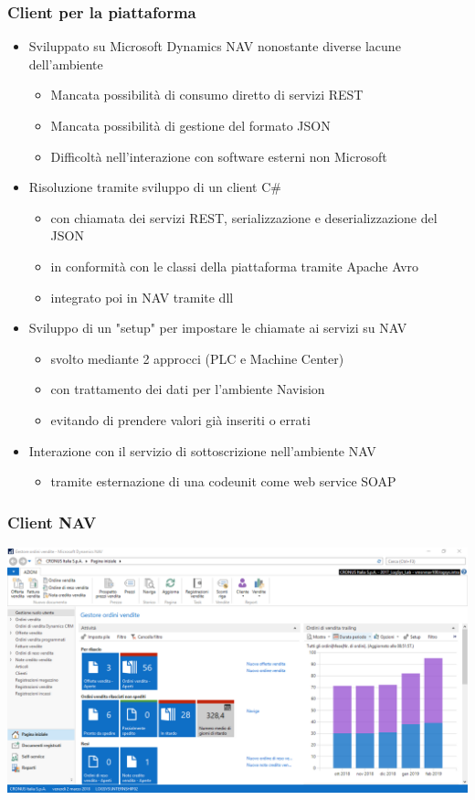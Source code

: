 \documentclass{beamer}
\begin{document}
\begin{frame}
\frametitle{Client per la piattaforma}
\begin{itemize}
\item Sviluppato su Microsoft Dynamics NAV nonostante diverse lacune dell'ambiente
\begin{itemize}
\item Mancata possibilità di consumo diretto di servizi REST
\item Mancata possibilità di gestione del formato JSON
\item Difficoltà nell'interazione con software esterni non Microsoft
\end{itemize}
\item Risoluzione tramite sviluppo di un client C\#
\begin{itemize}
\item con chiamata dei servizi REST, serializzazione e deserializzazione del JSON
\item in conformità con le classi della piattaforma tramite Apache Avro
\item integrato poi in NAV tramite dll 
\end{itemize}
\item Sviluppo di un "setup" per impostare le chiamate ai servizi su NAV
\begin{itemize}
\item svolto mediante 2 approcci (PLC e Machine Center)
\item con trattamento dei dati per l'ambiente Navision
\item evitando di prendere valori già inseriti o errati
\end{itemize}

\item Interazione con il servizio di sottoscrizione nell'ambiente NAV
\begin{itemize}
\item tramite esternazione di una codeunit come web service SOAP
\end{itemize}
\end{itemize}
\end{frame}
\begin{frame}
\frametitle{Client NAV}
\includegraphics[width=1\textwidth]{images/NAVClient.png}
\end{frame}
\end{document}
